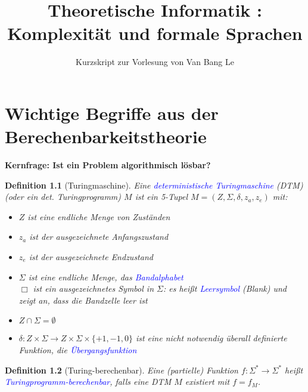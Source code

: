 \documentclass{scrreprt}
\begin{document}
\title{Theoretische Informatik {\uppercase\expandafter{}}:\\Komplexität und formale Sprachen}
\subtitle{Kurzskript zur Vorlesung von Van Bang Le}

\maketitle
\tableofcontents

\newtheorem{Definition}{Definition}[section]
\newtheorem{Satz}{Satz}[section]
\newtheorem{Lemma}{Lemma}[section]
\newtheorem{Beispiel}{Beispiel}[section]


\setcounter{chapter}{-1}
\chapter{Wichtige Begriffe aus der Berechenbarkeitstheorie}
\textbf{Kernfrage: Ist ein Problem algorithmisch lösbar?}

\begin{Definition}[Turingmaschine]
Eine \textcolor{blue}{deterministische Turingmaschine} (DTM) (oder ein det. Turingprogramm) $M$ ist ein 5-Tupel $M=(Z,\Sigma,\delta,z_a,z_e)$ mit:
\begin{itemize}
\item $Z$ ist eine endliche Menge von Zuständen
\item $z_a$ ist der ausgezeichnete Anfangszustand
\item $z_e$ ist der ausgezeichnete Endzustand
\item $\Sigma$ ist eine endliche Menge, das \textcolor{blue}{Bandalphabet}\\
$\Box$ ist ein ausgezeichnetes Symbol in $\Sigma$: es heißt \textcolor{blue}{Leersymbol} (Blank) und zeigt an, dass die Bandzelle leer ist
\item $Z \cap \Sigma = \emptyset$
\item $\delta : Z \times \Sigma \rightarrow Z \times \Sigma \times \{+1,-1,0\}$ ist eine nicht notwendig überall definierte Funktion, die \textcolor{blue}{Übergangsfunktion} 
\end{itemize}
\end{Definition}

\begin{Definition}[Turing-berechenbar]
Eine (partielle) Funktion $f: \Sigma^* \rightarrow \Sigma^*$ heißt \textcolor{blue}{Turingprogramm-berechenbar}, falls eine DTM $M$ existiert mit $f=f_M$.
\end{Definition}
\end{document}
